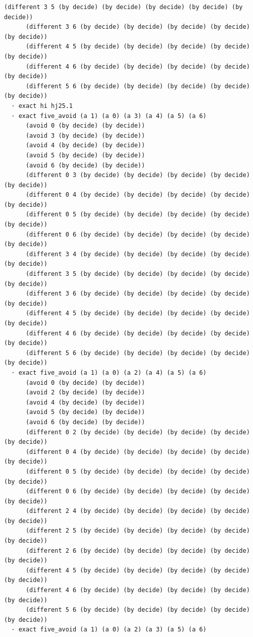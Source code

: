 \documentclass[11pt,a4paper]{article}
\begin{document}
\begin{Verbatim}[breaklines,breakanywhere,fontsize=\footnotesize]
      (different 3 5 (by decide) (by decide) (by decide) (by decide) (by decide))
      (different 3 6 (by decide) (by decide) (by decide) (by decide) (by decide))
      (different 4 5 (by decide) (by decide) (by decide) (by decide) (by decide))
      (different 4 6 (by decide) (by decide) (by decide) (by decide) (by decide))
      (different 5 6 (by decide) (by decide) (by decide) (by decide) (by decide))
  · exact hi hj25.1
  · exact five_avoid (a 1) (a 0) (a 3) (a 4) (a 5) (a 6)
      (avoid 0 (by decide) (by decide))
      (avoid 3 (by decide) (by decide))
      (avoid 4 (by decide) (by decide))
      (avoid 5 (by decide) (by decide))
      (avoid 6 (by decide) (by decide))
      (different 0 3 (by decide) (by decide) (by decide) (by decide) (by decide))
      (different 0 4 (by decide) (by decide) (by decide) (by decide) (by decide))
      (different 0 5 (by decide) (by decide) (by decide) (by decide) (by decide))
      (different 0 6 (by decide) (by decide) (by decide) (by decide) (by decide))
      (different 3 4 (by decide) (by decide) (by decide) (by decide) (by decide))
      (different 3 5 (by decide) (by decide) (by decide) (by decide) (by decide))
      (different 3 6 (by decide) (by decide) (by decide) (by decide) (by decide))
      (different 4 5 (by decide) (by decide) (by decide) (by decide) (by decide))
      (different 4 6 (by decide) (by decide) (by decide) (by decide) (by decide))
      (different 5 6 (by decide) (by decide) (by decide) (by decide) (by decide))
  · exact five_avoid (a 1) (a 0) (a 2) (a 4) (a 5) (a 6)
      (avoid 0 (by decide) (by decide))
      (avoid 2 (by decide) (by decide))
      (avoid 4 (by decide) (by decide))
      (avoid 5 (by decide) (by decide))
      (avoid 6 (by decide) (by decide))
      (different 0 2 (by decide) (by decide) (by decide) (by decide) (by decide))
      (different 0 4 (by decide) (by decide) (by decide) (by decide) (by decide))
      (different 0 5 (by decide) (by decide) (by decide) (by decide) (by decide))
      (different 0 6 (by decide) (by decide) (by decide) (by decide) (by decide))
      (different 2 4 (by decide) (by decide) (by decide) (by decide) (by decide))
      (different 2 5 (by decide) (by decide) (by decide) (by decide) (by decide))
      (different 2 6 (by decide) (by decide) (by decide) (by decide) (by decide))
      (different 4 5 (by decide) (by decide) (by decide) (by decide) (by decide))
      (different 4 6 (by decide) (by decide) (by decide) (by decide) (by decide))
      (different 5 6 (by decide) (by decide) (by decide) (by decide) (by decide))
  · exact five_avoid (a 1) (a 0) (a 2) (a 3) (a 5) (a 6)

\end{Verbatim}
\end{document}
